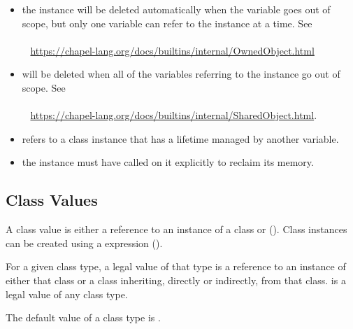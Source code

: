 \begin{itemize}
  \item {} the instance will be deleted
    automatically when the  variable goes out of scope, but
    only one  variable can refer to the instance at a time.
    See
    \\ %
    \mbox{$$ $$ $$ $$ $$} %
    \url{https://chapel-lang.org/docs/builtins/internal/OwnedObject.html}

  \item {} will be deleted when all of the 
    variables referring to the instance go out of scope.
    See
    \\ %
    \mbox{$$ $$ $$ $$ $$} %
    \url{https://chapel-lang.org/docs/builtins/internal/SharedObject.html}.

  \item {} refers to a class instance that has a lifetime
    managed by another variable.

  \item {} the instance must have  called on
    it explicitly to reclaim its memory.

\end{itemize}


\subsection{Class Values}
\label{Class_Values}

A class value is either a reference to an instance of a class
or  (). Class instances can be created
using a  expression ().

For a given class type, a legal value of that type is a reference to
an instance of either that class or a class inheriting, directly or
indirectly, from that class.
 is a legal value of any class type.

The default value of a class type is .

